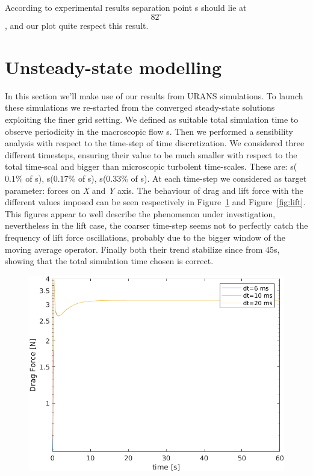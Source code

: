 \documentclass[12pt]{article}
\begin{document}
According to experimental results separation point s should lie at $$ 82 ^\circ $$, and our plot quite respect this result.

\section{Unsteady-state modelling} \label{sec:URAN}
In this section we'll make use of our results from URANS simulations. To launch these simulations we re-started from the converged steady-state solutions exploiting the finer grid setting.
We defined as suitable total simulation time to observe periodicity in the macroscopic flow \:s.
Then we performed a sensibility analysis with respect to the time-step of time discretization. We considered three different timesteps, ensuring their value to be much smaller with respect to the total time-scal and bigger than microscopic turbolent time-scales. These are: \:s\:($0.1\%$ of \:s), \:s\:($0.17\%$ of \:s), \:s\:($0.33\%$ of \:s). At each time-step we considered as target parameter: forces on \textit{X} and \textit{Y} axis.
The behaviour of drag and lift force with the  different values imposed can be seen respectively in Figure~\ref{fig:drag} and Figure~\ref{fig:lift}. This figures appear to well describe the phenomenon under investigation, nevertheless in the lift case, the coarser time-step seems not to perfectly catch the frequency of lift force oscillations, probably due to the bigger window of the moving average operator.
Finally both their trend stabilize since from 45\:s, showing that the total simulation time chosen is correct.

        \begin{figure}[!ht]
                \includegraphics[width=\textwidth]{DragForce.png}
                \centering
                \caption{}
                \label{fig:drag}
        \end{figure}
\end{document}
